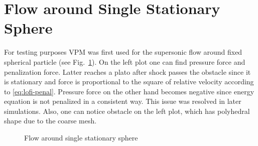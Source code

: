 \section{Flow around Single Stationary Sphere}
For testing purposes VPM was first used for the supersonic flow around fixed spherical particle (see Fig.~\ref{fig:lofi_single_stat}). On the left plot one can find pressure force and penalization force. Latter reaches a plato after shock passes the obstacle since it is stationary and force is proportional to the square of relative velocity according to \eqref{eq:lofi-penal}. Pressure force on the other hand becomes negative since energy equation is not penalized in a consistent way. This issue was resolved in later simulations. Also, one can notice obstacle on the left plot, which has polyhedral shape due to the coarse mesh.
\begin{figure}[t]
\begin{minipage}{0.5\linewidth}
\end{minipage}
\begin{minipage}{0.5\linewidth}
\end{minipage}
\caption{Flow around single stationary sphere} \label{fig:lofi_single_stat}
\end{figure}

